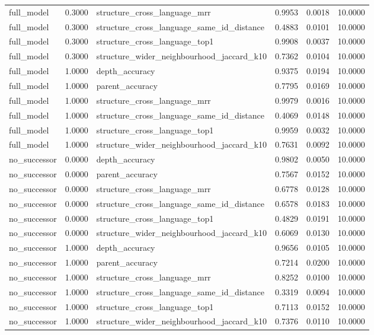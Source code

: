 \begin{tabular}{llllll}
full\_model & 0.3000 & structure\_cross\_language\_mrr & 0.9953 & 0.0018 & 10.0000 \\
full\_model & 0.3000 & structure\_cross\_language\_same\_id\_distance & 0.4883 & 0.0101 & 10.0000 \\
full\_model & 0.3000 & structure\_cross\_language\_top1 & 0.9908 & 0.0037 & 10.0000 \\
full\_model & 0.3000 & structure\_wider\_neighbourhood\_jaccard\_k10 & 0.7362 & 0.0104 & 10.0000 \\
full\_model & 1.0000 & depth\_accuracy & 0.9375 & 0.0194 & 10.0000 \\
full\_model & 1.0000 & parent\_accuracy & 0.7795 & 0.0169 & 10.0000 \\
full\_model & 1.0000 & structure\_cross\_language\_mrr & 0.9979 & 0.0016 & 10.0000 \\
full\_model & 1.0000 & structure\_cross\_language\_same\_id\_distance & 0.4069 & 0.0148 & 10.0000 \\
full\_model & 1.0000 & structure\_cross\_language\_top1 & 0.9959 & 0.0032 & 10.0000 \\
full\_model & 1.0000 & structure\_wider\_neighbourhood\_jaccard\_k10 & 0.7631 & 0.0092 & 10.0000 \\
no\_successor & 0.0000 & depth\_accuracy & 0.9802 & 0.0050 & 10.0000 \\
no\_successor & 0.0000 & parent\_accuracy & 0.7567 & 0.0152 & 10.0000 \\
no\_successor & 0.0000 & structure\_cross\_language\_mrr & 0.6778 & 0.0128 & 10.0000 \\
no\_successor & 0.0000 & structure\_cross\_language\_same\_id\_distance & 0.6578 & 0.0183 & 10.0000 \\
no\_successor & 0.0000 & structure\_cross\_language\_top1 & 0.4829 & 0.0191 & 10.0000 \\
no\_successor & 0.0000 & structure\_wider\_neighbourhood\_jaccard\_k10 & 0.6069 & 0.0130 & 10.0000 \\
no\_successor & 1.0000 & depth\_accuracy & 0.9656 & 0.0105 & 10.0000 \\
no\_successor & 1.0000 & parent\_accuracy & 0.7214 & 0.0200 & 10.0000 \\
no\_successor & 1.0000 & structure\_cross\_language\_mrr & 0.8252 & 0.0100 & 10.0000 \\
no\_successor & 1.0000 & structure\_cross\_language\_same\_id\_distance & 0.3319 & 0.0094 & 10.0000 \\
no\_successor & 1.0000 & structure\_cross\_language\_top1 & 0.7113 & 0.0152 & 10.0000 \\
no\_successor & 1.0000 & structure\_wider\_neighbourhood\_jaccard\_k10 & 0.7376 & 0.0110 & 10.0000 \\
 \hline
\end{tabular}
